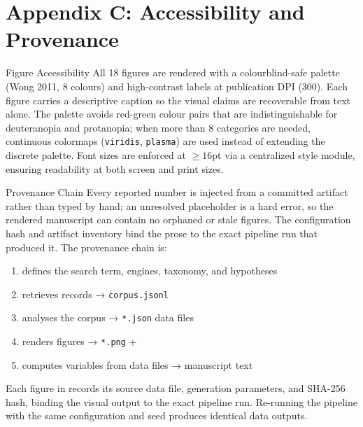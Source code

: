 \documentclass[
  ignorenonframetext,
]{beamer}
\author{\texorpdfstring{}{}}
\date{}
\providecommand{\tightlist}{%
  \setlength{\itemsep}{0pt}\setlength{\parskip}{0pt}}
\begin{document}
\section{Appendix C: Accessibility and
Provenance}\label{appendix-c-accessibility-and-provenance}

\begin{frame}{Figure Accessibility}
\protect{}\label{figure-accessibility}
All 18 figures are rendered with a colourblind-safe palette (Wong 2011,
8 colours) and high-contrast labels at publication DPI (300). Each
figure carries a descriptive caption so the visual claims are
recoverable from text alone. The palette avoids red-green colour pairs
that are indistinguishable for deuteranopia and protanopia; when more
than 8 categories are needed, continuous colormaps (\texttt{viridis},
\texttt{plasma}) are used instead of extending the discrete palette.
Font sizes are enforced at \(\geq 16\)pt via a centralized style module,
ensuring readability at both screen and print sizes.
\end{frame}

\begin{frame}{Provenance Chain}
\protect{}\label{provenance-chain}
Every reported number is injected from a committed artifact rather than
typed by hand; an unresolved placeholder is a hard error, so the
rendered manuscript can contain no orphaned or stale figures. The
configuration hash and artifact inventory bind the prose to the exact
pipeline run that produced it. The provenance chain is:

\begin{enumerate}
\tightlist
\item
   defines the search term, engines,
  taxonomy, and hypotheses
\item
   retrieves records →
  \texttt{corpus.jsonl}
\item
   analyses the corpus →
  \texttt{*.json} data files
\item
   renders figures →
  \texttt{*.png} + 
\item
   computes variables from data
  files → manuscript text
\end{enumerate}

Each figure in  records its source data
file, generation parameters, and SHA-256 hash, binding the visual output
to the exact pipeline run. Re-running the pipeline with the same
configuration and seed produces identical data outputs.
\end{frame}
\end{document}
